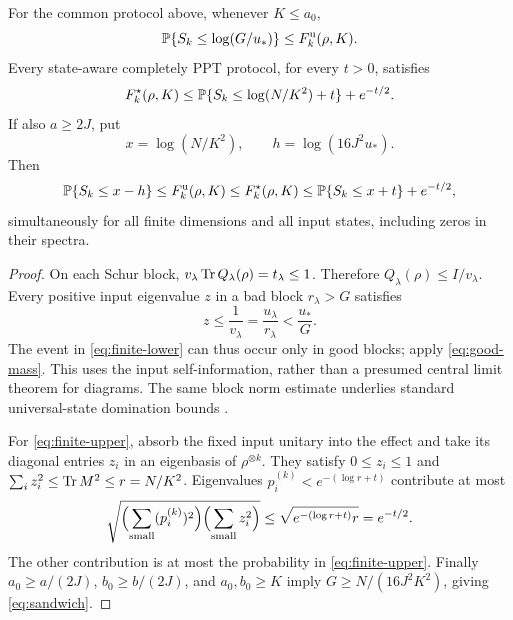 \begin{theorem}\label{thm:sandwich}
For the common protocol above, whenever $K\le a_0$,
\begin{equation}\label{eq:finite-lower}
 \mathbb P\{S_k\le\log(G/u_*)\}\le F_k^{\rm u}(\rho,K).
\end{equation}
Every state-aware completely PPT protocol, for every $t>0$, satisfies
\begin{equation}\label{eq:finite-upper}
 F_k^\star(\rho,K)\le
 \mathbb P\{S_k\le\log(N/K^2)+t\}+e^{-t/2}.
\end{equation}
If also $a\ge2J$, put
\[
 x=\log(N/K^2),\qquad h=\log(16J^2u_*).
\]
Then
\begin{equation}\label{eq:sandwich}
 \mathbb P\{S_k\le x-h\}\le F_k^{\rm u}(\rho,K)
 \le F_k^\star(\rho,K)\le\mathbb P\{S_k\le x+t\}+e^{-t/2},
\end{equation}
simultaneously for all finite dimensions and all input states, including zeros in their spectra.
\end{theorem}
\begin{proof}
On each Schur block, $v_\lambda\operatorname{Tr} Q_\lambda(\rho)=t_\lambda\le1$. Therefore $Q_\lambda(\rho)\le I/v_\lambda$. Every positive input eigenvalue $z$ in a bad block $r_\lambda>G$ satisfies
\[
 z\le\frac1{v_\lambda}=\frac{u_\lambda}{r_\lambda}<\frac{u_*}G.
\]
The event in \eqref{eq:finite-lower} can thus occur only in good blocks; apply \eqref{eq:good-mass}. This uses the input self-information, rather than a presumed central limit theorem for diagrams. The same block norm estimate underlies standard universal-state domination bounds \cite{hayashi-univ}.

For \eqref{eq:finite-upper}, absorb the fixed input unitary into the effect and take its diagonal entries $z_i$ in an eigenbasis of $\rho^{\otimes k}$. They satisfy $0\le z_i\le1$ and $\sum_i z_i^2\le\operatorname{Tr} M^2\le r=N/K^2$. Eigenvalues $p_i^{(k)}<e^{-(\log r+t)}$ contribute at most
\[
 \sqrt{\Bigl(\sum_{\rm small}(p_i^{(k)})^2\Bigr)\Bigl(\sum_{\rm small}z_i^2\Bigr)}
 \le\sqrt{e^{-(\log r+t)}r}=e^{-t/2}.
\]
The other contribution is at most the probability in \eqref{eq:finite-upper}. Finally $a_0\ge a/(2J)$, $b_0\ge b/(2J)$, and $a_0,b_0\ge K$ imply $G\ge N/(16J^2K^2)$, giving \eqref{eq:sandwich}.
\end{proof}

